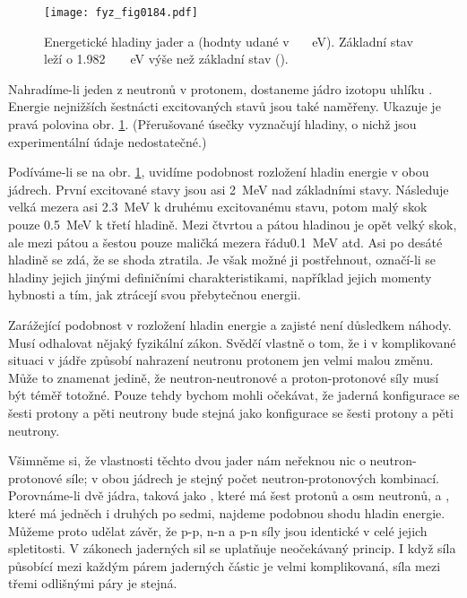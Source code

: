     \begin{figure}[ht!]  %
      \centering
      \texttt{[image: fyz\_fig0184.pdf]}
      \caption{Energetické hladiny jader  a  (hodnty udané v
              \si{\protect\mega\protect\electronvolt}). Základní stav  leží o
              \protect\SI{1.982}{\protect\mega\protect\electronvolt} výše než základní stav 
              (\cite[s.~149]{Feynman02}).}
      \label{fyz:fig0184}
    \end{figure}

    Nahradíme-li jeden z neutronů v  protonem, dostaneme jádro izotopu uhlíku .
    Energie nejnižších šestnácti excitovaných stavů  jsou také naměřeny. Ukazuje je pravá
    polovina obr. \ref{fyz:fig0184}. (Přerušované úsečky vyznačují hladiny, o nichž jsou
    experimentální údaje nedostatečné.)

    Podíváme-li se na obr. \ref{fyz:fig0184}, uvidíme podobnost rozložení hladin energie v obou
    jádrech. První excitované stavy jsou asi \SI{2}{\mega\electronvolt} nad základními stavy.
    Následuje velká mezera asi \SI{2.3}{\mega\electronvolt} k druhému excitovanému stavu, potom malý
    skok pouze \SI{0.5}{\mega\electronvolt} k třetí hladině. Mezi čtvrtou a pátou hladinou je opět
    velký skok, ale mezi pátou a šestou pouze maličká mezera řádu\SI{0.1}{\mega\electronvolt} atd.
    Asi po desáté hladině se zdá, že se shoda ztratila. Je však možné ji postřehnout, označí-li se
    hladiny jejich jinými definičními charakteristikami, například jejich momenty hybnosti a tím,
    jak ztrácejí svou přebytečnou energii.

    Zarážející podobnost v rozložení hladin energie  a  zajisté není důsledkem
    náhody. Musí odhalovat nějaký fyzikální zákon. Svědčí vlastně o tom, že i v komplikované situaci
    v jádře způsobí nahrazení neutronu protonem jen velmi malou změnu. Může to znamenat jedině, že
    neutron-neutronové a proton-protonové síly musí být téměř totožné. Pouze tehdy bychom mohli
    očekávat, že jaderná konfigurace se šesti protony a pěti neutrony bude stejná jako konfigurace
    se šesti protony a pěti neutrony.

    Všimněme si, že vlastnosti těchto dvou jader nám neřeknou nic o neutron-protonové síle; v obou
    jádrech je stejný počet neutron-protonových kombinací. Porovnáme-li dvě jádra, taková jako
    , které má šest protonů a osm neutronů, a , které má jedněch i druhých po
    sedmi, najdeme podobnou shodu hladin energie. Můžeme proto udělat závěr, že p-p, n-n a p-n síly
    jsou identické v celé jejich spletitosti. V zákonech jaderných sil se uplatňuje neočekávaný
    princip. I když síla působící mezi každým párem jaderných částic je velmi komplikovaná, síla
    mezi třemi odlišnými páry je stejná.

